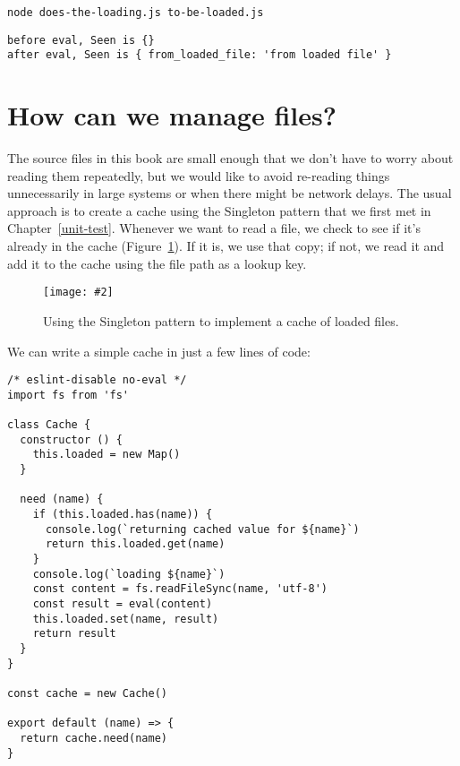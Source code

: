 \documentclass[krantzl]{krantz}
\newcommand{\figpdf}[4]{\begin{figure}%
\centering%
\texttt{[image: \#2]}%
\caption{#3}%
\label{#1}%
\end{figure}}
\newcommand{\chapref}[1]{Chapter~\ref{#1}}
\newcommand{\figref}[1]{Figure~\ref{#1}}
\begin{document}
\begin{lstlisting}[frame=single,frameround=tttt]
node does-the-loading.js to-be-loaded.js
\end{lstlisting}



\begin{lstlisting}[frame=single,frameround=tttt]
before eval, Seen is {}
after eval, Seen is { from_loaded_file: 'from loaded file' }
\end{lstlisting}


\section{How can we manage files?}\label{file-interpolator-manage}


The source files in this book are small enough
that we don't have to worry about reading them repeatedly,
but we would like to avoid re-reading things unnecessarily
in large systems or when there might be network delays.
The usual approach is to create a cache
using the Singleton pattern
that we first met in \chapref{unit-test}.
Whenever we want to read a file,
we check to see if it's already in the cache
(\figref{file-interpolator-cache}).
If it is,
we use that copy;
if not,
we read it and add it to the cache
using the file path as a lookup key.

\figpdf{file-interpolator-cache}{./file-interpolator/cache.pdf}{Using the Singleton pattern to implement a cache of loaded files.}{0.6}


We can write a simple cache in just a few lines of code:


\begin{lstlisting}[frame=single,frameround=tttt]
/* eslint-disable no-eval */
import fs from 'fs'

class Cache {
  constructor () {
    this.loaded = new Map()
  }

  need (name) {
    if (this.loaded.has(name)) {
      console.log(`returning cached value for ${name}`)
      return this.loaded.get(name)
    }
    console.log(`loading ${name}`)
    const content = fs.readFileSync(name, 'utf-8')
    const result = eval(content)
    this.loaded.set(name, result)
    return result
  }
}

const cache = new Cache()

export default (name) => {
  return cache.need(name)
}
\end{lstlisting}
\end{document}
